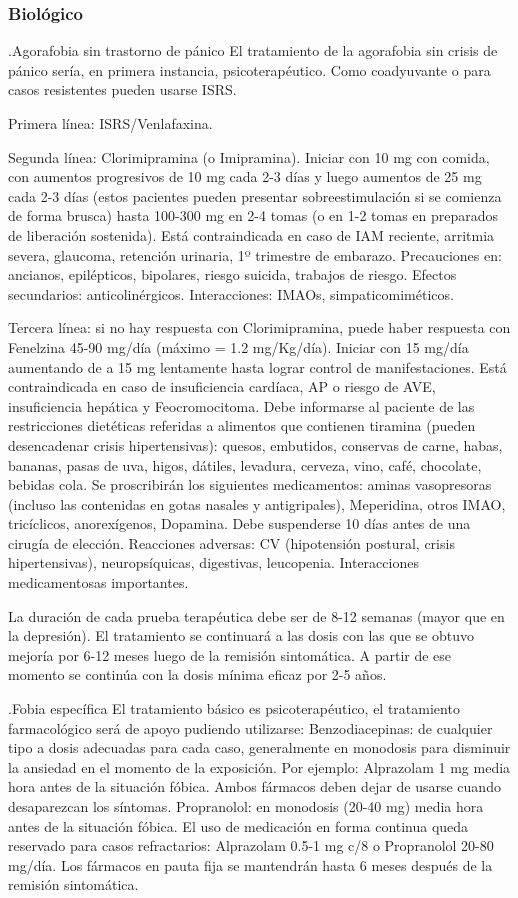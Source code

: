 \documentclass{scrbook}
\begin{document}
\subsubsection*{Biológico}
.Agorafobia sin trastorno de pánico
El tratamiento de la agorafobia sin crisis de pánico sería, en primera instancia, psicoterapéutico. Como coadyuvante o para casos resistentes pueden usarse ISRS.

Primera línea: ISRS/Venlafaxina.

Segunda línea: Clorimipramina (o Imipramina). Iniciar con 10 mg con comida, con aumentos progresivos de 10 mg cada 2-3 días y luego aumentos de 25 mg cada 2-3 días (estos pacientes pueden presentar sobreestimulación si se comienza de forma brusca) hasta 100-300 mg en 2-4 tomas (o en 1-2 tomas en preparados de liberación sostenida). Está contraindicada en caso de IAM reciente, arritmia severa, glaucoma, retención urinaria, 1º trimestre de embarazo. Precauciones en: ancianos, epilépticos, bipolares, riesgo suicida, trabajos de riesgo. Efectos secundarios: anticolinérgicos. Interacciones: IMAOs, simpaticomiméticos.

Tercera línea: si no hay respuesta con Clorimipramina, puede haber respuesta con Fenelzina 45-90 mg/día (máximo = 1.2 mg/Kg/día). Iniciar con 15 mg/día aumentando de a 15 mg lentamente hasta lograr control de manifestaciones. Está contraindicada en caso de insuficiencia cardíaca, AP o riesgo de AVE, insuficiencia hepática y Feocromocitoma. Debe informarse al paciente de las restricciones dietéticas referidas a alimentos que contienen tiramina (pueden desencadenar crisis hipertensivas): quesos, embutidos, conservas de carne, habas, bananas, pasas de uva, higos, dátiles, levadura, cerveza, vino, café, chocolate, bebidas cola. Se proscribirán los siguientes medicamentos: aminas vasopresoras (incluso las contenidas en gotas nasales y antigripales), Meperidina, otros IMAO, tricíclicos, anorexígenos, Dopamina. Debe suspenderse 10 días antes de una cirugía de elección. Reacciones adversas: CV (hipotensión postural, crisis hipertensivas), neuropsíquicas, digestivas, leucopenia. Interacciones medicamentosas importantes.

La duración de cada prueba terapéutica debe ser de 8-12 semanas (mayor que en la depresión). El tratamiento se continuará a las dosis con las que se obtuvo mejoría por 6-12 meses luego de la remisión sintomática. A partir de ese momento se continúa con la dosis mínima eficaz por 2-5 años.

.Fobia específica
El tratamiento básico es psicoterapéutico, el tratamiento farmacológico será de apoyo pudiendo utilizarse: Benzodiacepinas: de cualquier tipo a dosis adecuadas para cada caso, generalmente en monodosis para disminuir la ansiedad en el momento de la exposición. Por ejemplo: Alprazolam 1 mg media hora antes de la situación fóbica. Ambos fármacos deben dejar de usarse cuando desaparezcan los síntomas. Propranolol: en monodosis (20-40 mg) media hora antes de la situación fóbica. El uso de medicación en forma continua queda reservado para casos refractarios: Alprazolam 0.5-1 mg c/8 o Propranolol 20-80 mg/día. Los fármacos en pauta fija se mantendrán hasta 6 meses después de la remisión sintomática.
\end{document}

